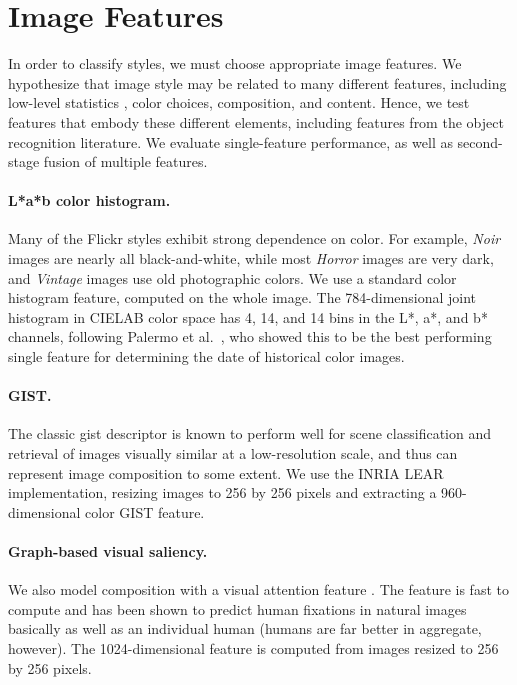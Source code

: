 \section{Image Features}

In order to classify styles, we must choose appropriate image features.  We hypothesize that image style may be related to many different features, including low-level statistics \cite{Lyu-PNAS-2004}, color choices, composition, and content.  Hence, we test features that embody these different elements, including features from the object recognition literature.
We evaluate single-feature performance, as well as second-stage fusion of multiple features.

\vspace{-1em}
\paragraph{L*a*b color histogram.}
Many of the Flickr styles exhibit strong dependence on color. For example, \emph{Noir} images are nearly all black-and-white, while most \emph{Horror} images are very dark, and \emph{Vintage} images use old photographic colors. We use a standard color histogram feature, computed on the whole image.
The 784-dimensional joint histogram in CIELAB color space has 4, 14, and 14 bins in the L*, a*, and b* channels, following Palermo et al.~\cite{Palermo-ECCV-2012}, who showed this to be the best performing single feature for determining the date of historical color images.

\vspace{-1em}
\paragraph{GIST.}
The classic gist descriptor \cite{Oliva-IJCV-2001} is known to perform well for scene classification and retrieval of images visually similar at a low-resolution scale, and thus can represent image composition to some extent.
We use the INRIA LEAR implementation, resizing images to 256 by 256 pixels and extracting a 960-dimensional color GIST feature.

\vspace{-1em}
\paragraph{Graph-based visual saliency.}
We also model composition with a visual attention feature \cite{Harel-NIPS-2006}.
The feature is fast to compute and has been shown to predict human fixations in natural images basically as well as an individual human (humans are far better in aggregate, however).
The 1024-dimensional feature is computed from images resized to 256 by 256 pixels.

